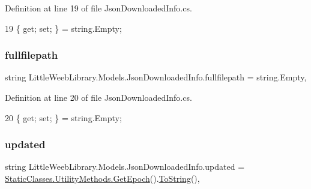 Definition at line 19 of file Json\+Downloaded\+Info.\+cs.


\begin{DoxyCode}
19 \{ \textcolor{keyword}{get}; \textcolor{keyword}{set}; \} = \textcolor{keywordtype}{string}.Empty;
\end{DoxyCode}
\mbox{\label{class_little_weeb_library_1_1_models_1_1_json_downloaded_info_a6bd6f4b0515ff75d2dac485ff1a7f434}} 
\subsubsection{\texorpdfstring{fullfilepath}{fullfilepath}}
{\footnotesize\ttfamily string Little\+Weeb\+Library.\+Models.\+Json\+Downloaded\+Info.\+fullfilepath = string.\+Empty\hspace{0.3cm}{\ttfamily [get]}, {\ttfamily [set]}}



Definition at line 20 of file Json\+Downloaded\+Info.\+cs.


\begin{DoxyCode}
20 \{ \textcolor{keyword}{get}; \textcolor{keyword}{set}; \} = \textcolor{keywordtype}{string}.Empty;
\end{DoxyCode}
\mbox{\label{class_little_weeb_library_1_1_models_1_1_json_downloaded_info_a60ae790ecf3f0779b1e6d94964970ff1}} 
\subsubsection{\texorpdfstring{updated}{updated}}
{\footnotesize\ttfamily string Little\+Weeb\+Library.\+Models.\+Json\+Downloaded\+Info.\+updated = \mbox{\hyperlink{class_little_weeb_library_1_1_static_classes_1_1_utility_methods_a12336d9e64983ddabaad8950486fafb2}{Static\+Classes.\+Utility\+Methods.\+Get\+Epoch}}().\mbox{\hyperlink{class_little_weeb_library_1_1_models_1_1_json_downloaded_info_a1ffa120527f102b7bf96a4c0a2d9e298}{To\+String}}()\hspace{0.3cm}{\ttfamily [get]}, {\ttfamily [set]}}



